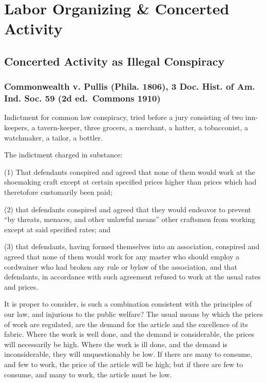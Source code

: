 \documentclass[
  letterpaper,
  11pt,
  DIV=9,
  openright]{scrbook}
\begin{document}
\chapter{Labor Organizing \& Concerted
Activity}\label{labor-organizing-concerted-activity}

\section{Concerted Activity as Illegal
Conspiracy}\label{concerted-activity-as-illegal-conspiracy}

\subsection{Commonwealth v. Pullis (Phila. 1806), 3 Doc. Hist. of Am.
Ind. Soc. 59 (2d ed.~Commons
1910)}\label{commonwealth-v.-pullis-phila.-1806-3-doc.-hist.-of-am.-ind.-soc.-59-2d-ed.-commons-1910}

Indictment for common law conspiracy, tried before a jury consisting of
two inn-keepers, a tavern-keeper, three grocers, a merchant, a hatter, a
tobacconist, a watchmaker, a tailor, a bottler.

The indictment charged in substance:

(1) That defendants conspired and agreed that none of them would work at
the shoemaking craft except at certain specified prices higher than
prices which had theretofore customarily been paid;

(2) that defendants conspired and agreed that they would endeavor to
prevent ``by threats, menaces, and other unlawful means'' other
craftsmen from working except at said specified rates; and

(3) that defendants, having formed themselves into an association,
conspired and agreed that none of them would work for any master who
should employ a cordwainer who had broken any rule or bylaw of the
association, and that defendants, in accordance with such agreement
refused to work at the usual rates and prices.


It is proper to consider, is such a combination consistent with the
principles of our law, and injurious to the public welfare? The usual
means by which the prices of work are regulated, are the demand for the
article and the excellence of its fabric. Where the work is well done,
and the demand is considerable, the prices will necessarily be high.
Where the work is ill done, and the demand is inconsiderable, they will
unquestionably be low. If there are many to consume, and few to work,
the price of the article will be high; but if there are few to consume,
and many to work, the article must be low.
\end{document}
